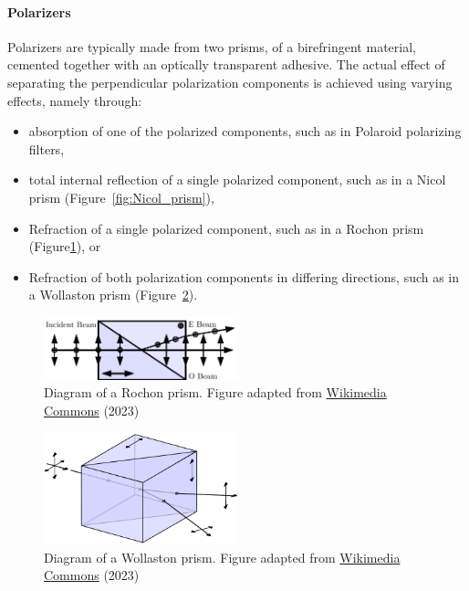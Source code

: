 \paragraph{Polarizers}
Polarizers are typically made from two prisms, of a birefringent material, cemented together with an optically transparent adhesive. The actual effect of separating the perpendicular polarization components is achieved using varying effects, namely through:
\begin{itemize}
    \item absorption of one of the polarized components, such as in Polaroid polarizing filters,
    \item total internal reflection of a single polarized component, such as in a Nicol prism (Figure~\ref{fig:Nicol_prism}),
    \item Refraction of a single polarized component, such as in a Rochon prism (Figure\ref{fig:Rochon_prism}), or
    \item Refraction of both polarization components in differing directions, such as in a Wollaston prism (Figure~\ref{fig:Wollaston_prism}).
\end{itemize}

\begin{figure}[t]
    \centering
    \includegraphics[width=0.5\textwidth]{figures/2_rochon.pdf}
    \caption{Diagram of a Rochon prism. Figure adapted from \protect\href{https://commons.wikimedia.org/wiki/File:Rochon_Prism.svg}{Wikimedia Commons} (2023)}
    \label{fig:Rochon_prism}
\end{figure}

\begin{figure}[t]
    \centering
    \includegraphics[width=0.5\textwidth]{figures/2_wollaston.pdf}
    \caption{Diagram of a Wollaston prism. Figure adapted from \protect\href{https://commons.wikimedia.org/wiki/File:Wollaston-prism.svg}{Wikimedia Commons} (2023)}
    \label{fig:Wollaston_prism}
\end{figure}

